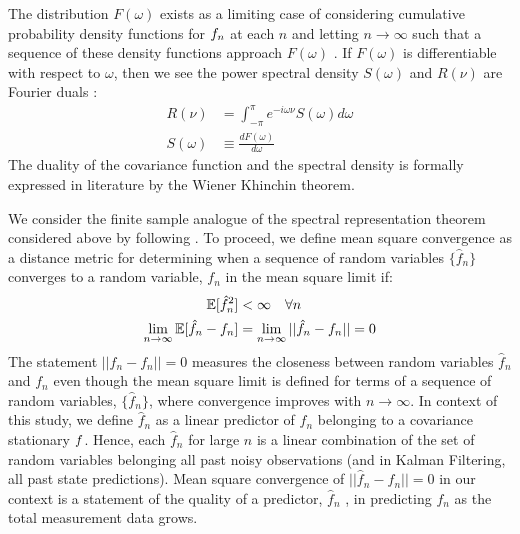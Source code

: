 The distribution $F(\omega)$ exists as a limiting case of considering cumulative probability density functions for $f_n$ at each $n$ and letting $n \to \infty$ such that a sequence of these density functions approach $F(\omega)$ \cite{karlin1975first}.  If $F(\omega)$ is differentiable with respect to $\omega$, then we see the power spectral density $S(\omega)$ and $R(\nu)$ are Fourier duals \cite{karlin1975first}:
\begin{align}
R(\nu) & = \int_{-\pi}^{\pi} e^{-i\omega \nu } S(\omega)d\omega \\
S(\omega) & \equiv \frac{dF(\omega)}{d\omega} 
\end{align}
The duality of the covariance function and the spectral density is formally expressed  in literature by the  Wiener Khinchin theorem.

We consider the finite sample analogue of the spectral representation theorem considered above by following \cite{hamilton1994time}. To proceed, we define mean square convergence as a distance metric for determining when a sequence of random variables $\{ \hat{f}_n\}$ converges to a random variable, $f_n$ in the mean square limit if:
\begin{align}
\mathbb{E}[\hat{f}_n^2] & < \infty \quad \forall n \\
\lim_{n \to \infty}\mathbb{E}[\hat{f}_n - f_n] & = \lim_{n \to \infty} ||\hat{f}_n- f_n || = 0
\end{align} 
The statement $||\hat{f}_n- f_n || = 0$ measures the closeness between random variables $\hat{f}_n$ and $f_n$ even though the mean square limit is defined for terms of a sequence of random variables, $\{ \hat{f}_n\}$, where convergence improves with $n \to \infty$. In context of this study, we define $\hat{f}_n$ as a linear predictor of $f_n$ belonging to a covariance stationary $f$. Hence, each $\hat{f}_n$ for large $n$ is a linear combination of the set of random variables belonging all past noisy observations (and in Kalman Filtering,  all past state predictions). Mean square convergence of $||\hat{f}_n- f_n || = 0$ in our context is a statement of the quality of a predictor, $\hat{f}_n$ , in predicting $f_n$ as the total measurement data grows.

